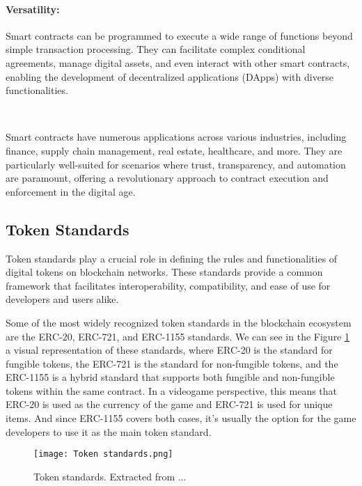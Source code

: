 \paragraph{Versatility:}
Smart contracts can be programmed to execute a wide range of functions beyond simple transaction processing. They can facilitate complex conditional agreements, manage digital assets, and even interact with other smart contracts, enabling the development of decentralized applications (DApps) with diverse functionalities.

~

Smart contracts have numerous applications across various industries, including finance, supply chain management, real estate, healthcare, and more. They are particularly well-suited for scenarios where trust, transparency, and automation are paramount, offering a revolutionary approach to contract execution and enforcement in the digital age.

\subsection{Token Standards}
\label{subsec:token_standards}

Token standards play a crucial role in defining the rules and functionalities of digital tokens on blockchain networks. These standards provide a common framework that facilitates interoperability, compatibility, and ease of use for developers and users alike.

Some of the most widely recognized token standards in the blockchain ecosystem are the ERC-20, ERC-721, and ERC-1155 standards. We can see in the Figure \ref{fig:token_standards} a visual representation of these standards, where ERC-20 is the standard for fungible tokens, the ERC-721 is the standard for non-fungible tokens, and the ERC-1155 is a hybrid standard that supports both fungible and non-fungible tokens within the same contract. In a videogame perspective, this means that ERC-20 is used as the currency of the game and ERC-721 is used for unique items. And since ERC-1155 covers both cases, it's usually the option for the game developers to use it as the main token standard.

\begin{figure}[H]
    \texttt{[image: Token standards.png]}
    \centering
    \caption[Token standards]{Token standards. Extracted from ...}
    \label{fig:token_standards}
\end{figure}


